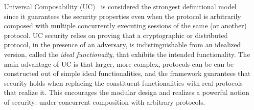 Universal Composability (UC)~\cite{canettiUC} %
is considered the strongest definitional model since it guarantees the security properties even when the protocol is arbitrarily composed with
multiple concurrently executing sessions of the same (or another) protocol.
UC security relies on proving that a cryptographic or distributed protocol, in the presence of an adversary, is indistinguishable from an idealized version, called the \emph{ideal functionaity}, that exhibits the intended functionality.
The main advantage of UC is that larger, more complex, protocols can be can be constructed out of simple ideal functionalities, and the framework guarantees that security holds when 
replacing the constituent functionalities with real protocols that realize it.
This encourages the modular design and realizes a powerful notion of security: under concurrent composition with arbitrary protocols.



